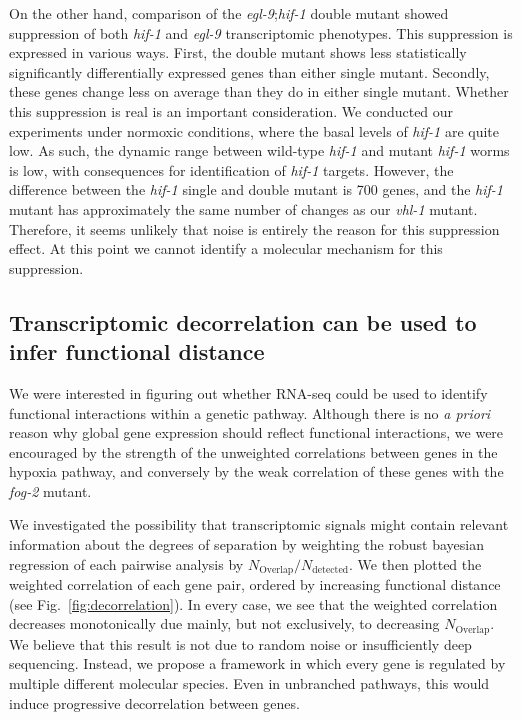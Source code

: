 \documentclass[9pt,twocolumn,twoside]{pnas-new}
\newcommand{\egl}{\emph{egl-9}}
\newcommand{\vhl}{\emph{vhl-1}}
\newcommand{\hif}{\emph{hif-1}}
\newcommand{\fog}{\emph{fog-2}}
\begin{document}
On the other hand, comparison of the \egl{};\hif{} double mutant showed suppression of both \hif{} and \egl{} transcriptomic phenotypes. This suppression is expressed in various ways. First, the double mutant shows less statistically significantly differentially expressed genes than either single mutant. Secondly, these genes change less on average than they do in either single mutant. Whether this suppression is real is an important consideration. We conducted our experiments under normoxic conditions, where the basal levels of \hif{} are quite low. As such, the dynamic range between wild-type \hif{} and mutant \hif{} worms is low, with consequences for identification of \hif{} targets.
However, the difference between the \hif{} single and double mutant is 700 genes, and the \hif{} mutant has approximately the same number of changes as our \vhl{} mutant. Therefore, it seems unlikely that noise is entirely the reason for this suppression effect. At this point we cannot identify a molecular mechanism for this suppression.

\subsection{Transcriptomic decorrelation can be used to infer functional distance}
\label{sub:decorrelation}
We were interested in figuring out whether RNA-seq could be used to identify functional interactions within a genetic pathway. Although there is no \emph{a priori} reason why global gene expression should reflect functional interactions, we were encouraged by the strength of the unweighted correlations between genes in the hypoxia pathway, and conversely by the weak correlation of these genes with the \fog{} mutant.

We investigated the possibility that transcriptomic signals might contain relevant information about the degrees of separation by weighting the robust bayesian regression of each pairwise analysis by $N_\mathrm{Overlap}/N_{\mathrm{detected}}$. We then plotted the weighted correlation of each gene pair, ordered by increasing functional distance (see Fig.~\ref{fig:decorrelation}). In every case, we see that the weighted correlation decreases monotonically due mainly, but not exclusively, to decreasing $N_\mathrm{Overlap}$.
We believe that this result is not due to random noise or insufficiently deep sequencing. Instead, we propose a framework in which every gene is regulated by multiple different molecular species. Even in unbranched pathways, this would induce progressive decorrelation between genes.
\end{document}
